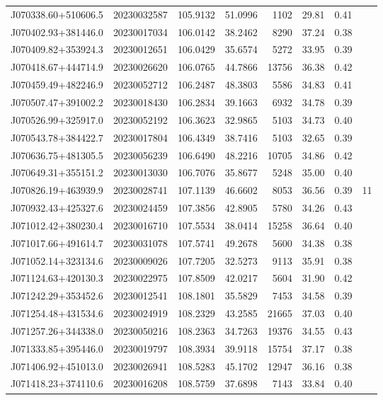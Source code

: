 \documentclass{article}
\begin{document}
\begin {longtable}{|l|l|r|r|r|r|r|l|}
 J070338.60+510606.5&  20230032587&  105.9132&   51.0996&  1102& 29.81& 0.41&\\
 J070402.93+381446.0&  20230017034&  106.0142&   38.2462&  8290& 37.24& 0.38&\\
 J070409.82+353924.3&  20230012651&  106.0429&   35.6574&  5272& 33.95& 0.39&\\
 J070418.67+444714.9&  20230026620&  106.0765&   44.7866& 13756& 36.38& 0.42&\\
 J070459.49+482246.9&  20230052712&  106.2487&   48.3803&  5586& 34.83& 0.41&\\
 J070507.47+391002.2&  20230018430&  106.2834&   39.1663&  6932& 34.78& 0.39&\\
 J070526.99+325917.0&  20230052192&  106.3623&   32.9865&  5103& 34.73& 0.40&\\
 J070543.78+384422.7&  20230017804&  106.4349&   38.7416&  5103& 32.65& 0.39&\\
 J070636.75+481305.5&  20230056239&  106.6490&   48.2216& 10705& 34.86& 0.42&\\
 J070649.31+355151.2&  20230013030&  106.7076&   35.8677&  5248& 35.00& 0.40&\\
 J070826.19+463939.9&  20230028741&  107.1139&   46.6602&  8053& 36.56& 0.39&11\\
 J070932.43+425327.6&  20230024459&  107.3856&   42.8905&  5780& 34.26& 0.43&\\
 J071012.42+380230.4&  20230016710&  107.5534&   38.0414& 15258& 36.64& 0.40&\\
 J071017.66+491614.7&  20230031078&  107.5741&   49.2678&  5600& 34.38& 0.38&\\
 J071052.14+323134.6&  20230009026&  107.7205&   32.5273&  9113& 35.91& 0.38&\\
 J071124.63+420130.3&  20230022975&  107.8509&   42.0217&  5604& 31.90& 0.42&\\
 J071242.29+353452.6&  20230012541&  108.1801&   35.5829&  7453& 34.58& 0.39&\\
 J071254.48+431534.6&  20230024919&  108.2329&   43.2585& 21665& 37.03& 0.40&\\
 J071257.26+344338.0&  20230050216&  108.2363&   34.7263& 19376& 34.55& 0.43&\\
 J071333.85+395446.0&  20230019797&  108.3934&   39.9118& 15754& 37.17& 0.38&\\
 J071406.92+451013.0&  20230026941&  108.5283&   45.1702& 12947& 36.16& 0.38&\\
 J071418.23+374110.6&  20230016208&  108.5759&   37.6898&  7143& 33.84& 0.40&\\

\end{longtable}
\end{document}

